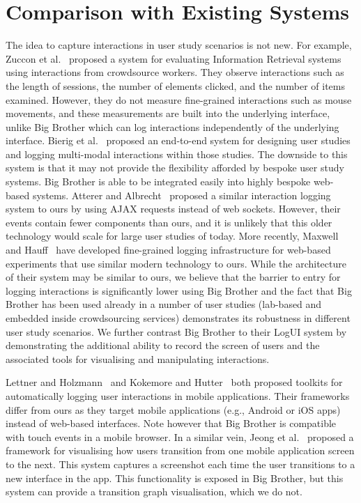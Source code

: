 \vspace{-16pt}
\section{Comparison with Existing Systems}

The idea to capture interactions in user study scenarios is not new. For example, Zuccon et al.~\cite{zuccon2013crowdsourcing} proposed a system for evaluating Information Retrieval systems using interactions from crowdsource workers. They observe interactions such as the length of sessions, the number of elements clicked, and the number of items examined. However, they do not measure fine-grained interactions such as mouse movements, and these measurements are built into the underlying interface, unlike Big Brother which can log interactions independently of the underlying interface. Bierig et al.~\cite{bierig2009user} proposed an end-to-end system for designing user studies and logging multi-modal interactions within those studies. The downside to this system is that it may not provide the flexibility afforded by bespoke user study systems. Big Brother is able to be integrated easily into highly bespoke web-based systems. Atterer and Albrecht~\cite{atterer2007tracking} proposed a similar interaction logging system to ours by using AJAX requests instead of web sockets. However, their events contain fewer components than ours, and it is unlikely that this older technology would scale for large user studies of today. More recently, Maxwell and Hauff~\cite{maxwell2021logui} have developed fine-grained logging infrastructure for web-based experiments that use similar modern technology to ours. While the architecture of their system may be similar to ours, we believe that the barrier to entry for logging interactions is significantly lower using Big Brother and the fact that Big Brother has been used already in a number of user studies (lab-based and embedded inside crowdsourcing services) demonstrates its robustness in different user study scenarios. We further contrast Big Brother to their LogUI system by demonstrating the additional ability to record the screen of users and the associated tools for visualising and manipulating interactions.

Lettner and Holzmann~\cite{lettner2012automated} and Kokemore and Hutter~\cite{kokemor2016aspect} both proposed toolkits for automatically logging user interactions in mobile applications. Their frameworks differ from ours as they target mobile applications (e.g., Android or iOS apps) instead of web-based interfaces. Note however that Big Brother is compatible with touch events in a mobile browser. In a similar vein, Jeong et al.~\cite{jeong2020gui} proposed a framework for visualising how users transition from one mobile application screen to the next. This system captures a screenshot each time the user transitions to a new interface in the app. This functionality is exposed in Big Brother, but this system can provide a transition graph visualisation, which we do not. 
